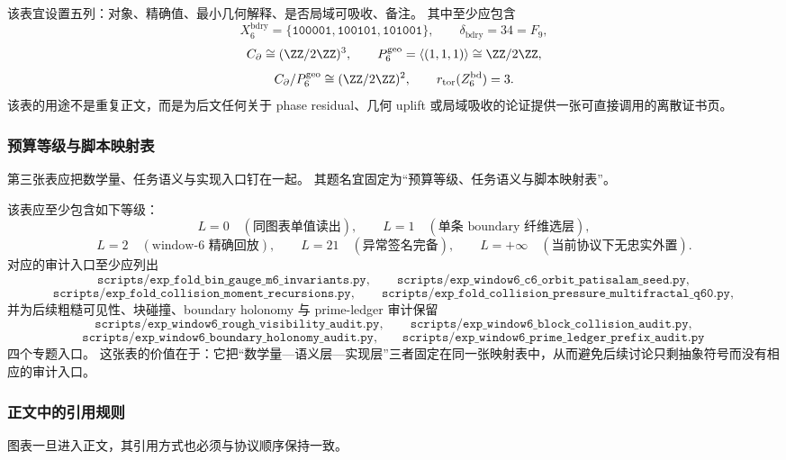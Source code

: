 该表宜设置五列：对象、精确值、最小几何解释、是否局域可吸收、备注。
其中至少应包含
\[
X_6^{\mathrm{bdry}}=\{\texttt{100001},\texttt{100101},\texttt{101001}\},
\qquad
\delta_{\mathrm{bdry}}=34=F_9,
\]
\[
C_{\partial}\cong (\ZZ/2\ZZ)^3,
\qquad
P_6^{\mathrm{geo}}=\langle(1,1,1)\rangle\cong \ZZ/2\ZZ,
\]
\[
C_{\partial}/P_6^{\mathrm{geo}}\cong (\ZZ/2\ZZ)^2,
\qquad
r_{\mathrm{tor}}(Z_6^{\mathrm{bd}})=3.
\]
该表的用途不是重复正文，而是为后文任何关于 phase residual、几何 uplift 或局域吸收的论证提供一张可直接调用的离散证书页。

\subsubsection{预算等级与脚本映射表}\label{subsubsec:typed-address-biaxial-completion-window6-table-budget-script-map}
第三张表应把数学量、任务语义与实现入口钉在一起。
其题名宜固定为“预算等级、任务语义与脚本映射表”。

该表应至少包含如下等级：
\[
L=0
\quad
(\text{同图表单值读出}),
\qquad
L=1
\quad
(\text{单条 boundary 纤维选层}),
\]
\[
L=2
\quad
(\text{window-}6\text{ 精确回放}),
\qquad
L=21
\quad
(\text{异常签名完备}),
\qquad
L=+\infty
\quad
(\text{当前协议下无忠实外置}).
\]
对应的审计入口至少应列出
\[
\texttt{scripts/exp\_fold\_bin\_gauge\_m6\_invariants.py},
\qquad
\texttt{scripts/exp\_window6\_c6\_orbit\_patisalam\_seed.py},
\]
\[
\texttt{scripts/exp\_fold\_collision\_moment\_recursions.py},
\qquad
\texttt{scripts/exp\_fold\_collision\_pressure\_multifractal\_q60.py},
\]
并为后续粗糙可见性、块碰撞、boundary holonomy 与 prime-ledger 审计保留
\[
\texttt{scripts/exp\_window6\_rough\_visibility\_audit.py},
\qquad
\texttt{scripts/exp\_window6\_block\_collision\_audit.py},
\]
\[
\texttt{scripts/exp\_window6\_boundary\_holonomy\_audit.py},
\qquad
\texttt{scripts/exp\_window6\_prime\_ledger\_prefix\_audit.py}
\]
四个专题入口。
这张表的价值在于：它把“数学量—语义层—实现层”三者固定在同一张映射表中，从而避免后续讨论只剩抽象符号而没有相应的审计入口。

\subsubsection{正文中的引用规则}\label{subsubsec:typed-address-biaxial-completion-window6-figure-table-citation-rule}
图表一旦进入正文，其引用方式也必须与协议顺序保持一致。

